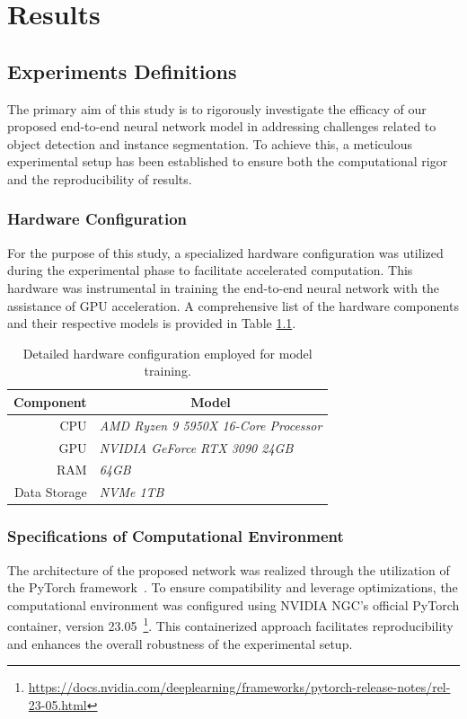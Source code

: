 \chapter{Results}

\section{Experiments Definitions}
The primary aim of this study is to rigorously investigate the efficacy of our proposed end-to-end neural network model in addressing challenges related to object detection and instance segmentation. To achieve this, a meticulous experimental setup has been established to ensure both the computational rigor and the reproducibility of results.

\subsection{Hardware Configuration}
For the purpose of this study, a specialized hardware configuration was utilized during the experimental phase to facilitate accelerated computation. This hardware was instrumental in training the end-to-end neural network with the assistance of GPU acceleration. A comprehensive list of the hardware components and their respective models is provided in Table \ref{tab:50:hard}.

\begin{table}[!htbp]
\centering 
\begin{tabular}{|r|l|}
\hline
\multicolumn{1}{|c|}{\textbf{Component}} & \multicolumn{1}{c|}{\textbf{Model}} \\ \hline
CPU & \textit{AMD Ryzen 9 5950X 16-Core Processor}\\
GPU & \textit{NVIDIA GeForce RTX 3090 24GB}\\
RAM & \textit{64GB} \\
Data Storage & \textit{NVMe 1TB}\\ \hline
\end{tabular}
\caption{Detailed hardware configuration employed for model training.}
\label{tab:50:hard}
\end{table}

\subsection{Specifications of Computational Environment}
The architecture of the proposed network was realized through the utilization of the PyTorch framework~\cite{NEURIPS2019_bdbca288}. To ensure compatibility and leverage optimizations, the computational environment was configured using NVIDIA NGC's official PyTorch container, version 23.05~\footnote{\url{https://docs.nvidia.com/deeplearning/frameworks/pytorch-release-notes/rel-23-05.html}}. This containerized approach facilitates reproducibility and enhances the overall robustness of the experimental setup.

